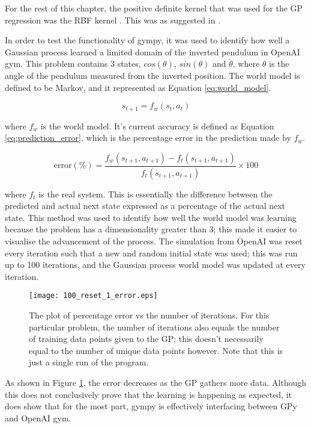 For the rest of this chapter, the positive definite kernel that was used for the GP regression was the RBF kernel \cite{gp-carl}. This was as suggested in \cite{2015-deisenroth}.

In order to test the functionality of gympy, it was used to identify how well a Gaussian process learned a limited domain of the inverted pendulum in OpenAI gym. This problem contains 3 states, $cos(\theta)$, $sin(\theta)$ and $\dot{\theta}$, where $\theta$ is the angle of the pendulum measured from the inverted position. The world model is defined to be Markov, and it represented as Equation \ref{eq:world_model}.

\begin{equation} \label{eq:world_model} s_{t+1} = f_w(s_t,a_t) \end{equation}

 where $f_w$ is the world model. It's current accuracy is defined as Equation \ref{eq:prediction_error}, which is the percentage error in the prediction made by $f_w$.
 
 \begin{equation} \label{eq:prediction_error} \mathrm{error}(\%)= \frac{f_w(s_{t+1},a_{t+1}) - f_t(s_{t+1},a_{t+1})}{f_t(s_{t+1},a_{t+1})} \times 100 \end{equation}
 
where $f_t$ is the real system. This is essentially the difference between the predicted and actual next state expressed as a percentage of the actual next state. This method was used to identify how well the world model was learning because the problem has a dimensionality greater than 3; this made it easier to visualise the advancement of the process. The simulation from OpenAI was reset every iteration such that a new and random initial state was used; this was run up to 100 iterations, and the Gaussian process world model was updated at every iteration. 

\begin{figure} \centering \scalebox{0.45} {\texttt{[image: 100\_reset\_1\_error.eps]}}\caption{The plot of percentage error vs the number of iterations. For this particular problem, the number of iterations also equals the number of training data points given to the GP; this doesn't necessarily equal to the number of unique data points however. Note that this is just a single run of the program.}\label{fig:100_reset_1}
\end{figure}

As shown in Figure \ref{fig:100_reset_1}, the error decreases as the GP gathers more data. Although this does not conclusively prove that the learning is happening as expected, it does show that for the most part, gympy is effectively interfacing between GPy and OpenAI gym.

